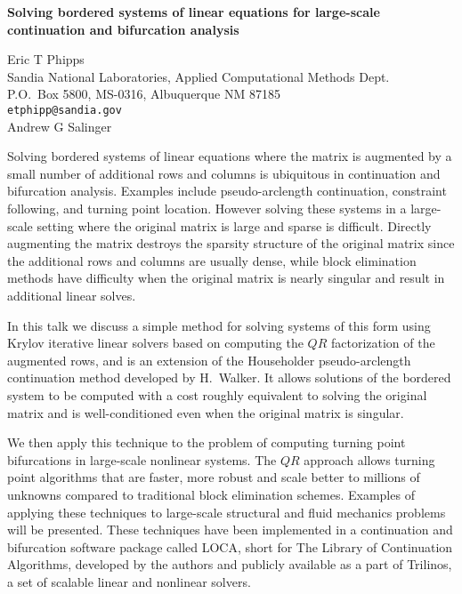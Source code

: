 \documentclass{report}
\begin{document}

\begin{center}
{\large
{\bf Solving bordered systems of linear equations for large-scale \\
	continuation and bifurcation analysis}}

	Eric T Phipps \\
	Sandia National Laboratories, Applied Computational Methods Dept. \\
	P.O.~Box 5800, MS-0316, Albuquerque NM 87185 \\
	{\tt etphipp@sandia.gov} \\
	Andrew G Salinger
\end{center}
Solving bordered systems of linear equations where the
matrix is augmented by a small number of additional rows and
columns is ubiquitous in continuation and bifurcation
analysis. Examples include pseudo-arclength continuation,
constraint following, and turning point location. However
solving these systems in a large-scale setting where the
original matrix is large and sparse is difficult. Directly
augmenting the matrix destroys the sparsity structure of the
original matrix since the additional rows and columns are
usually dense, while block elimination methods have
difficulty when the original matrix is nearly singular and
result in additional linear solves.

In this talk we
discuss a simple method for solving systems of this form
using Krylov iterative linear solvers based on computing the
$QR$ factorization of the augmented rows, and is an
extension of the Householder pseudo-arclength continuation
method developed by H.~Walker. It allows solutions of the
bordered system to be computed with a cost roughly
equivalent to solving the original matrix and is
well-conditioned even when the original matrix is singular.


We then apply this technique to the problem of computing
turning point bifurcations in large-scale nonlinear systems.
The $QR$ approach allows turning point algorithms that are
faster, more robust and scale better to millions of unknowns
compared to traditional block elimination schemes. Examples
of applying these techniques to large-scale structural and
fluid mechanics problems will be presented. These techniques
have been implemented in a continuation and bifurcation
software package called LOCA, short for The Library of
Continuation Algorithms, developed by the authors and
publicly available as a part of Trilinos, a set of scalable
linear and nonlinear solvers.



\end{document}
